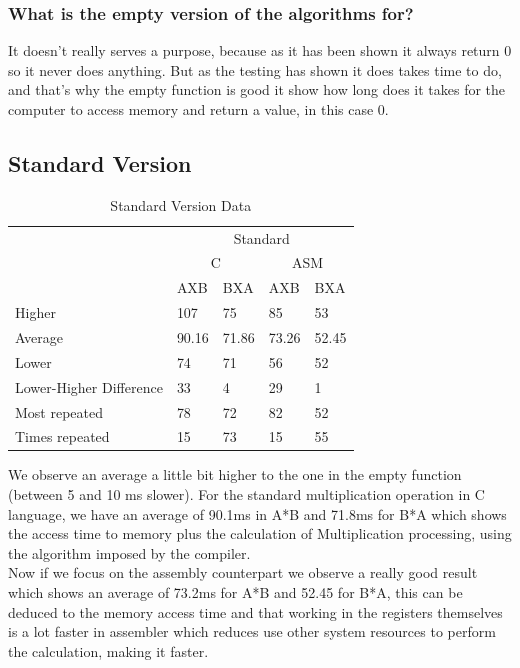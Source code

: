 \documentclass[legalpaper,12pt]{article}
\begin{document}
    \subsubsection{What is the empty version of the algorithms for?}
        \justifying
        It doesn't really serves a purpose, because as it has been shown it always return 0 so it never does anything. But as the testing has shown it does takes time to do, and that's why the empty function is good it show how long does it takes for the computer to access memory and return a value, in this case 0. 
\newpage

\subsection{Standard Version}
    \begin{table}[h]
        \caption{Standard Version Data}
        \centering
        \begin{tabular}{|l|l|l|l|l|}
        \hline
        \multirow{3}{*}{}       & \multicolumn{4}{c|}{Standard}                     \\ \cline{2-5} 
                                & \multicolumn{2}{c|}{C} & \multicolumn{2}{c|}{ASM} \\ \cline{2-5} 
                                & AXB        & BXA       & AXB         & BXA        \\ \hline
        Higher                  & 107        & 75        & 85          & 53         \\ \hline
        Average                 & 90.16      & 71.86     & 73.26       & 52.45      \\ \hline
        Lower                   & 74         & 71        & 56          & 52         \\ \hline\hline
        Lower-Higher Difference & 33         & 4         & 29          & 1          \\ \hline\hline
        Most repeated           & 78         & 72        & 82          & 52         \\ \hline
        Times repeated          & 15         & 73        & 15          & 55         \\ \hline
        \end{tabular}
        \label{resultados2}
    \end{table}
    \justifying
    We observe an average a little bit higher to the one in the empty function (between 5 and 10 ms slower). For the standard multiplication operation in C language, we have an average of 90.1ms in A*B and 71.8ms for B*A which shows the access time to memory plus the calculation of Multiplication processing, using the algorithm imposed by the compiler. \\
    \justifying
    Now if we focus on the assembly counterpart we observe a really good result which shows an average of 73.2ms for A*B and 52.45 for B*A, this can be deduced to the memory access time and that working in the registers themselves is a lot faster in assembler which reduces use other system resources to perform the calculation, making it faster.\\
\newpage
\end{document}
